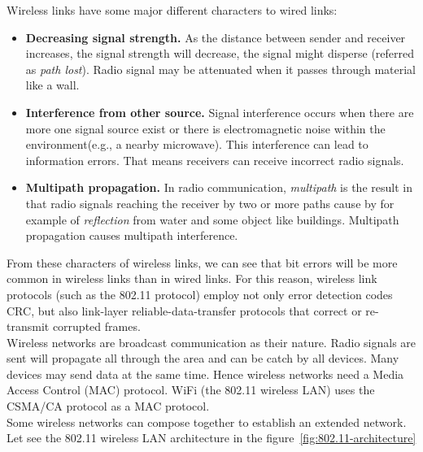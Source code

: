 \documentclass[a4paper, 11pt]{article}
\begin{document}
Wireless links have some major different characters to wired links:\\

\begin{itemize}
\item \textbf{Decreasing signal strength.} As the distance between sender and receiver increases, the signal strength will decrease, the signal might disperse (referred as \textit{path lost}). Radio signal may be attenuated when it passes through material like a wall.
\item \textbf{Interference from other source.} Signal interference occurs when there are more one signal source exist or there is electromagnetic noise within the environment(e.g., a nearby microwave). This interference can lead to information errors. That means receivers can receive incorrect radio signals.
\item \textbf{Multipath propagation.} In radio communication, \textit{multipath} is the result in that radio signals reaching the receiver by two or more paths cause by for example of \textit{reflection} from water and some object like buildings. Multipath propagation causes multipath interference.
\end{itemize} 

From these characters of wireless links, we can see that bit errors will be more common in wireless links than in wired links. For this reason, wireless link protocols (such as the 802.11 protocol) employ not only error detection codes CRC, but also link-layer reliable-data-transfer protocols that correct or re-transmit corrupted frames.\\

Wireless networks are broadcast communication as their nature. Radio signals are sent will propagate all through the area and can be catch by all devices.  Many devices may send data at the same time. Hence wireless networks need a Media Access Control (MAC) protocol. WiFi (the 802.11 wireless LAN) uses the CSMA/CA protocol as a MAC protocol.\\

Some wireless networks can compose together to establish an extended network. Let see the 802.11 wireless LAN architecture in the figure~\ref{fig:802.11-architecture}
\end{document}
